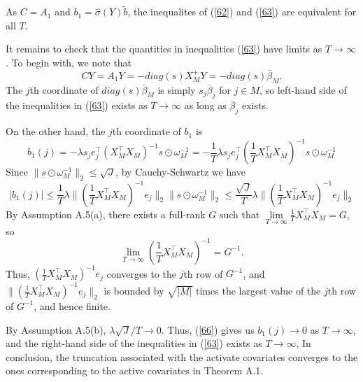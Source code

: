 \documentclass[11pt]{article}
\begin{document}
\begin{enumerate}
		As $C=A_1$ and $b_1=\hat{\sigma}(Y)\tilde{b}$, the inequalites of (\ref{62}) and (\ref{63}) are equivalent for all $T$.
  
  It remains to check that the quantities in inequalities (\ref{63}) have limits as $T\to\infty$.
		 To begin with, we note that
		\begin{equation}
CY=A_1Y=-diag(s)X_M^+Y=-diag(s)\bar{\beta}_M.
		\end{equation}
The $j$th coordinate of $diag(s)\bar{\beta}_M$ is simply $s_j\bar{\beta}_j$ for $j\in M$, so left-hand side of the inequalities in (\ref{63}) exists as $T\to\infty$ as long as $\bar{\beta}_j$ exists. 
		
		On the other hand, the $j$th coordinate of $b_1$ is
\begin{equation}
b_1(j)
	= -\lambda s_je_j^\top(X_M^\top X_M)^{-1}s\odot\omega^{-1}_M
	= -\frac{1}{T}\lambda s_je_j^\top(\frac{1}{T}X_M^\top X_M)^{-1}s\odot\omega^{-1}_M
\end{equation}
		Since $\|s\odot\omega^{-1}_M\|_2\leq \sqrt{J}$, by Cauchy-Schwartz we have
		\begin{equation}\label{66}
			|b_1(j)|
			\leq  \frac{1}{T}\lambda \| (\frac{1}{T}X_M^\top X_M)^{-1}e_j\|_2\|s\odot\omega^{-1}_M\|_2
    \leq   \frac{\sqrt{J}}{T}\lambda \| (\frac{1}{T}X_M^\top X_M)^{-1}e_j\|_2
		\end{equation}
	By Assumption A.5(a), there exists a full-rank $G$ such that $\lim\limits_{T\to\infty}\frac{1}{T}X_M^\top X_M=G$, so
	\begin{equation}\label{exist_inv_G}
\lim\limits_{T\to\infty}(\frac{1}{T}X_M^\top X_M)^{-1}= G^{-1}.
	\end{equation}
Thus, $ (\frac{1}{T}X_M^\top X_M)^{-1}e_j$ converges to the $j$th row of $G^{-1}$, and $\| (\frac{1}{T}X_M^\top X_M)^{-1}e_j\|_2$ is bounded by $\sqrt{|M|}$ times the largest value of the $j$th row of $G^{-1}$, and hence finite.

 By Assumption A.5(b), $\lambda \sqrt{J}/T\to 0$.  Thus, (\ref{66}) gives us $b_1(j)\to 0$ as $T\to\infty$, and the right-hand side of the inequalities in (\ref{63}) exists as $T\to\infty$, In conclusion, the truncation associated with the activate covariates converges to the ones corresponding to the active covariates in Theorem A.1.
	

\end{enumerate}
\end{document}

